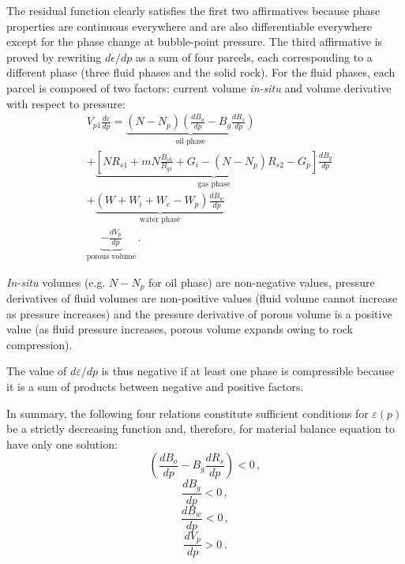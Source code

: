 \documentclass[authoryear,preprint,review,11pt]{elsarticle}
\begin{document}
The residual function clearly satisfies the first two affirmatives because phase properties are continuous everywhere and are also differentiable everywhere except for the phase change at bubble-point pressure.
The third affirmative is proved by rewriting $d\epsilon/dp$ as a sum of four parcels, each corresponding to a different phase (three fluid phases and the solid rock). For the fluid phases, each parcel is composed of two factors: current volume \textit{in-situ} and volume derivative with respect to pressure:
\begin{equation}
\begin{split}
&V_{p1}\frac{d\varepsilon}{dp}=\underbrace{\left(N-N_p\right) \left(\frac{dB_o}{dp} - B_g \frac{dR_s}{dp} \right)}_\text{oil phase}\\
&+\underbrace{\left[N R_{s1}+mN\frac{B_{o1}}{B_{g1}}+G_i-\left(N-N_p\right)R_{s2}-G_p\right] \frac{dB_g}{dp}}_\text{gas phase}\\
&+\underbrace{\left(W + W_i+W_e-W_p\right)\frac{dB_w}{dp}}_\text{water phase}\\
&\underbrace{-\frac{dV_p}{dp}}_\text{porous volume}\, .
\end{split}
\end{equation}

\textit{In-situ} volumes (e.g. $N-N_p$ for oil phase) are non-negative values,  pressure derivatives of fluid volumes are non-positive values (fluid volume cannot increase as pressure increases) and the pressure derivative of porous volume is a positive value (as fluid pressure increases, porous volume expands owing to rock compression). 

The value of $d\varepsilon/dp$ is thus negative if at least one phase is compressible because it is a sum of products between negative and positive factors.

In summary, the following four relations constitute sufficient conditions for $\varepsilon(p)$ be a strictly decreasing function and, therefore, for material balance equation to have only one solution:
\begin{equation}\label{eq: PVTH1}
\left(\frac{dB_o}{dp} - B_g \frac{dR_s}{dp} \right) < 0 \, ,
\end{equation}
\begin{equation}\label{eq: PVTH2}
\frac{dB_g}{dp} < 0 \, ,
\end{equation}
\begin{equation}\label{eq: PVTH3}
\frac{dB_w}{dp} < 0 \, ,
\end{equation}
\begin{equation}\label{eq: PVTH4}
\frac{dV_p}{dp} > 0 \, .
\end{equation}
\end{document}
